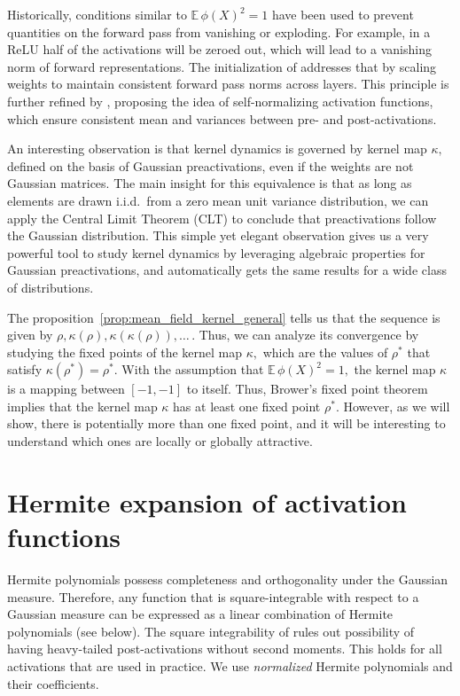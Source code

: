 \documentclass[twoside]{article}
\newcommand{\E}{\mathbb{E}\,}
\theoremstyle{definition}
\begin{document}
Historically, conditions similar to $\E \phi(X)^2=1$ have been used to prevent quantities on the forward pass from vanishing or exploding. For example, in a ReLU half of the activations will be zeroed out, which will lead to a vanishing norm of forward representations. The initialization of
\citep{he2016deep} addresses that by scaling weights to maintain consistent forward pass norms across layers. This principle is further refined by \citet{klambauer2017self}, proposing the idea of self-normalizing activation functions, which ensure consistent mean and variances between pre- and post-activations. 

An interesting observation is that kernel dynamics is governed by kernel map $\kappa,$ defined on the basis of Gaussian preactivations, even if the weights are not Gaussian matrices. The main insight for this equivalence is that as long as elements are drawn i.i.d.~from a zero mean unit variance distribution, we can apply the Central Limit Theorem (CLT) to conclude that preactivations follow the Gaussian distribution. This simple yet elegant observation gives us a very powerful tool to study kernel dynamics by leveraging algebraic properties for Gaussian preactivations, and automatically gets the same results for a wide class of distributions. 

The proposition~\ref{prop:mean_field_kernel_general} tells us that the sequence is given by $\rho,\kappa(\rho),\kappa(\kappa(\rho)),\dots\,.$ Thus, we can analyze its convergence by studying the fixed points of the kernel map $\kappa,$
which are the values of $\rho^*$ that satisfy $\kappa(\rho^*) = \rho^*.$  With the assumption that $\E \phi(X)^2=1,$ the kernel map $\kappa$ is a mapping between $[-1,-1]$ to itself. Thus, Brower's fixed point theorem implies that the kernel map $\kappa$ has at least one fixed point $\rho^*.$ However, as we will show, there is potentially more than one fixed point, and it will be interesting to understand which ones are locally or globally attractive. 


\section{Hermite expansion of activation functions}
Hermite polynomials possess completeness and orthogonality under the Gaussian measure. Therefore, any function that is square-integrable with respect to a Gaussian measure can be expressed as a linear combination of Hermite polynomials (see below). The square integrability of rules out possibility of having heavy-tailed post-activations without second moments. This holds for all activations that are used in practice. We use \emph{normalized} Hermite polynomials and their coefficients. 
\end{document}
